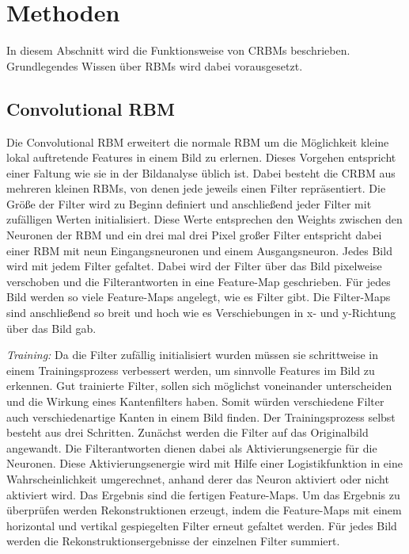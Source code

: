 \section{Methoden}\label{methods}
In diesem Abschnitt wird die Funktionsweise von CRBMs beschrieben.
Grundlegendes Wissen über RBMs wird dabei vorausgesetzt.

\subsection{Convolutional RBM}\label{CRBM}
Die Convolutional RBM erweitert die normale RBM um die Möglichkeit kleine lokal auftretende Features in einem Bild zu erlernen.
Dieses Vorgehen entspricht einer Faltung wie sie in der Bildanalyse üblich ist.
Dabei besteht die CRBM aus mehreren kleinen RBMs, von denen jede jeweils einen Filter repräsentiert.
Die Größe der Filter wird zu Beginn definiert und anschließend jeder Filter mit zufälligen Werten initialisiert.
Diese Werte entsprechen den Weights zwischen den Neuronen der RBM und ein drei mal drei Pixel großer Filter entspricht dabei einer RBM mit neun Eingangsneuronen und einem Ausgangsneuron.
Jedes Bild wird mit jedem Filter gefaltet.
Dabei wird der Filter über das Bild pixelweise verschoben und die Filterantworten in eine Feature-Map geschrieben.
Für jedes Bild werden so viele Feature-Maps angelegt, wie es Filter gibt.
Die Filter-Maps sind anschließend so breit und hoch wie es Verschiebungen in x- und y-Richtung über das Bild gab.

\textit{Training:}
Da die Filter zufällig initialisiert wurden müssen sie schrittweise in einem Trainingsprozess verbessert werden, um sinnvolle Features im Bild zu erkennen.
Gut trainierte Filter, sollen sich möglichst voneinander unterscheiden und die Wirkung eines Kantenfilters haben.
Somit würden verschiedene Filter auch verschiedenartige Kanten in einem Bild finden.
Der Trainingsprozess selbst besteht aus drei Schritten.
Zunächst werden die Filter auf das Originalbild angewandt.
Die Filterantworten dienen dabei als Aktivierungsenergie für die Neuronen.
Diese Aktivierungsenergie wird mit Hilfe einer Logistikfunktion in eine Wahrscheinlichkeit umgerechnet, anhand derer das Neuron aktiviert oder nicht aktiviert wird.
Das Ergebnis sind die fertigen Feature-Maps.
Um das Ergebnis zu überprüfen werden Rekonstruktionen erzeugt, indem die Feature-Maps mit einem horizontal und vertikal gespiegelten Filter erneut gefaltet werden.
Für jedes Bild werden die Rekonstruktionsergebnisse der einzelnen Filter summiert.

